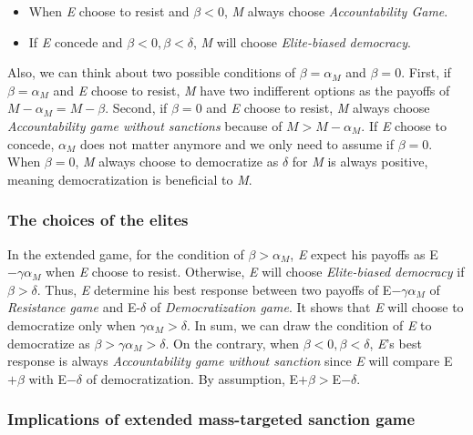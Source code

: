 \documentclass[11pt]{article}
\begin{document}
\begin{itemize}
	\item When \textit{E} choose to resist and $\beta < 0$, \textit{M} always choose \textit{Accountability Game}.
	\item If \textit{E} concede and $\beta < 0, \beta < \delta$, \textit{M} will choose \textit{Elite-biased democracy}.
\end{itemize}

Also, we can think about two possible conditions of $\beta = \alpha_{M}$ and $\beta = 0$. First, if $\beta = \alpha_{M}$ and \textit{E} choose to resist, \textit{M} have two indifferent options as the payoffs of $M-\alpha_{M} = M-\beta$. Second, if $\beta = 0$ and \textit{E} choose to resist, \textit{M} always choose \textit{Accountability game without sanctions} because of $M > M-\alpha_{M}$. If \textit{E} choose to concede, $\alpha_{M}$ does not matter anymore and we only need to assume if $\beta = 0$. When $\beta = 0$, \textit{M} always choose to democratize as $\delta$ for \textit{M} is always positive, meaning democratization is beneficial to \textit{M}.

\subsubsection*{The choices of the elites}

In the extended game, for the condition of $\beta > \alpha_{M}$, \textit{E} expect his payoffs as E$-\gamma\alpha_{M}$ when \textit{E} choose to resist. Otherwise, \textit{E} will choose \textit{Elite-biased democracy} if $\beta > \delta$. Thus, \textit{E} determine his best response between two payoffs of E$-\gamma\alpha_{M}$ of \textit{Resistance game} and E-$\delta$ of \textit{Democratization game}. It shows that \textit{E} will choose to democratize only when $\gamma\alpha_{M} > \delta$. In sum, we can draw the condition of \textit{E} to democratize as $\beta > \gamma\alpha_{M} > \delta$.  On the contrary, when $\beta < 0, \beta < \delta$, \textit{E}'s best response is always \textit{Accountability game without sanction} since \textit{E} will compare E$+\beta$ with E$-\delta$ of democratization. By assumption, E$+\beta >$E$-\delta$.

\subsubsection*{Implications of extended mass-targeted sanction game}
\end{document}
